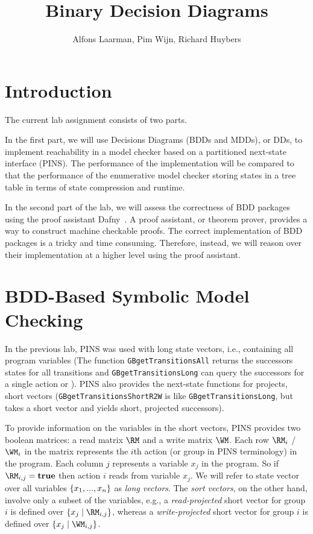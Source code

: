 \documentclass[12pt]{article}
\title{Binary Decision Diagrams}
\author{{Alfons Laarman, Pim Wijn, Richard Huybers}}
\begin{document}
\maketitle




\section{Introduction}

The current lab assignment consists of two parts.


In the first part, we will use 
Decisions Diagrams (BDDs and MDDs), or DDs, to
implement reachability in a model checker based on
a partitioned next-state interface (PINS).
The performance of the implementation will be compared
to that the performance of the enumerative model
checker storing states in a tree table
in terms of state compression and runtime.


In the second part of the lab, we will assess the correctness
of BDD packages using the proof assistant Dafny~\cite{dafny}.
A proof assistant, or theorem prover, provides a way to 
construct machine checkable proofs.
The correct  implementation of BDD packages is a tricky and time consuming.
Therefore, instead, we will reason over their implementation at
a higher level using the proof assistant.



\section{BDD-Based Symbolic Model Checking}


In the previous lab, 
PINS was used with long state vectors, i.e.,
containing all program variables
(The function \texttt{GBgetTransitionsAll} returns the successors states for all
transitions and \texttt{GBgetTransitionsLong} can query the successors for a
single action or ).
PINS also provides the next-state functions for projects, short vectors
(\texttt{GBgetTransitionsShortR2W} is like \texttt{GBgetTransitionsLong},
but takes a short vector and yields short, projected successors).

To provide information on the variables in the short vectors,
PINS provides two boolean matrices: a read matrix $\RM$ and a write matrix $\WM$.
Each row $\RM_i$ / $\WM_i$ in the matrix represents the $i$th action (or group in PINS
terminology) in the program. Each column $j$ represents a variable $x_j$
in the program. So if $\RM_{i,j}=\true$ then action $i$ reads from variable $x_j$.
We will refer to state vector over all variables $\left\lbrace x_1,...,x_n \right\rbrace$ as
\emph{long vectors}. The \emph{sort vectors}, on the other hand, involve only 
a subset of the variables, e.g., a \emph{read-projected} short vector for
group $i$ is defined over $\set{x_j\mid \RM_{i,j}}$, whereas
a \emph{write-projected} short vector for
group $i$ is defined over $\set{x_j\mid \WM_{i,j}}$.
\end{document}
